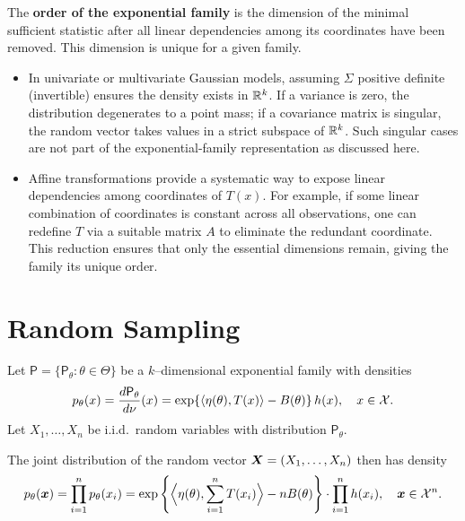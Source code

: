 \medskip
\begin{definition}
The \textbf{order of the exponential family} is the dimension of the minimal sufficient statistic after all linear dependencies among its coordinates have been removed. This dimension is unique for a given family. 
\end{definition}

\medskip
\begin{remark}
    \leavevmode
    \begin{itemize}
        \item 
In univariate or multivariate Gaussian models, assuming \(\Sigma\) positive definite (invertible) ensures the density exists in \(\mathbb{R}^k\). If a variance is zero, the distribution degenerates to a point mass; if a covariance matrix is singular, the random vector takes values in a strict subspace of \(\mathbb{R}^k\). Such singular cases are not part of the exponential-family representation as discussed here.  
\item 
Affine transformations provide a systematic way to expose linear dependencies among coordinates of \(T(x)\). For example, if some linear combination of coordinates is constant across all observations, one can redefine \(T\) via a suitable matrix \(A\) to eliminate the redundant coordinate. This reduction ensures that only the essential dimensions remain, giving the family its unique order.  
    \end{itemize}
\end{remark}

\section{Random Sampling}
\label{sec:rs}

Let \(\mathsf{P}=\{\mathsf{P}_{\theta} : \theta \in \Theta\}\) be a \(k\)--dimensional exponential family with densities
\[
    p_{\theta}(x)
    = \frac{d \mathsf{P}_{\theta}}{d \nu}(x)
    = \exp\{\langle \eta(\theta), T(x) \rangle - B(\theta)\} \, h(x),
    \quad x \in \mathcal{X}.
\]
Let \(X_1,\dots,X_n\) be i.i.d.\ random variables with distribution \(\mathsf{P}_{\theta}\).

The joint distribution of the random vector \(\boldsymbol{X}=(X_1,\dots,X_n)\) then has density
\[
    p_{\theta}(\boldsymbol{x})
    = \prod\limits_{i=1}^{n} p_{\theta}(x_i)
    = \exp\left\{
        \Big\langle \eta(\theta), \sum\limits_{i=1}^{n} T(x_i) \Big\rangle
        - n B(\theta)
      \right\}
      \cdot
      \prod\limits_{i=1}^{n} h(x_i),
    \quad \boldsymbol{x} \in \mathcal{X}^n.
\]

